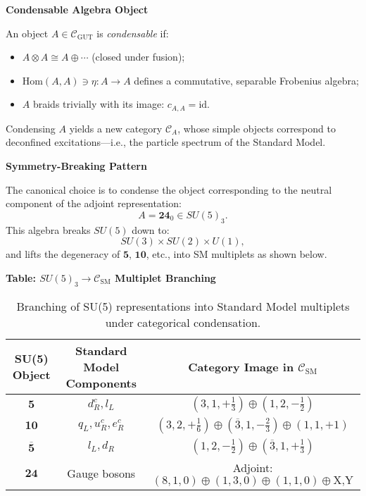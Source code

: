 \documentclass[11pt]{article}
\begin{document}
\vspace{0.5em}
\noindent\textbf{Condensable Algebra Object}

An object \( A \in \mathcal{C}_{\text{GUT}} \) is \emph{condensable} if:
\begin{itemize}
  \item \( A \otimes A \cong A \oplus \cdots \) (closed under fusion);
  \item \( \text{Hom}(A,A) \ni \eta: A \rightarrow A \) defines a commutative, separable Frobenius algebra;
  \item \( A \) braids trivially with its image: \( c_{A,A} = \text{id} \).
\end{itemize}

Condensing \( A \) yields a new category \( \mathcal{C}_A \), whose simple objects correspond to deconfined excitations—i.e., the particle spectrum of the Standard Model.

\vspace{0.5em}
\noindent\textbf{Symmetry-Breaking Pattern}

The canonical choice is to condense the object corresponding to the neutral component of the adjoint representation:
\[
A = \mathbf{24}_0 \in SU(5)_3.
\]
This algebra breaks \( SU(5) \) down to:
\[
SU(3) \times SU(2) \times U(1),
\]
and lifts the degeneracy of \( \mathbf{5} \), \( \mathbf{10} \), etc., into SM multiplets as shown below.

\vspace{0.5em}
\noindent\textbf{Table: \( SU(5)_3 \rightarrow \mathcal{C}_{\text{SM}} \) Multiplet Branching}

\begin{table}[H]
\centering
\renewcommand{\arraystretch}{1.2}
\begin{tabular}{|c|c|c|}
\hline
\textbf{SU(5) Object} & \textbf{Standard Model Components} & \textbf{Category Image in \( \mathcal{C}_{\text{SM}} \)} \\
\hline
\( \mathbf{5} \) & \( d_R^c, l_L \) & \( (3,1,+\tfrac{1}{3}) \oplus (1,2,-\tfrac{1}{2}) \) \\
\( \mathbf{10} \) & \( q_L, u_R^c, e_R^c \) & \( (3,2,+\tfrac{1}{6}) \oplus (\overline{3},1,-\tfrac{2}{3}) \oplus (1,1,+1) \) \\
\( \overline{\mathbf{5}} \) & \( l_L, d_R \) & \( (1,2,-\tfrac{1}{2}) \oplus (\overline{3},1,+\tfrac{1}{3}) \) \\
\( \mathbf{24} \) & Gauge bosons & Adjoint: \( (8,1,0) \oplus (1,3,0) \oplus (1,1,0) \oplus \text{X,Y} \) \\
\hline
\end{tabular}
\caption{Branching of SU(5) representations into Standard Model multiplets under categorical condensation.}
\label{tab:gut-sm-branching}
\end{table}
\end{document}
